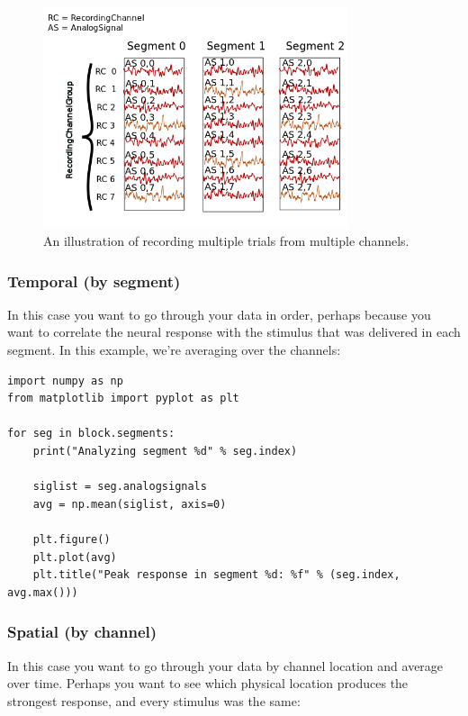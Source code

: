 \documentclass{frontiers}
\begin{document}
\begin{figure}
\centering
\includegraphics[width=0.8\textwidth]{figures/usecase1}
\caption{An illustration of recording multiple trials from multiple channels.}\label{fig:usecase1} 
\end{figure}

\subsubsection{Temporal (by segment)}

In this case you want to go through your data in order, perhaps because you want to correlate the neural response with the stimulus that was delivered in each segment. In this example, we’re averaging over the channels:

\begin{lstlisting}[style=display]
import numpy as np
from matplotlib import pyplot as plt

for seg in block.segments:
    print("Analyzing segment %d" % seg.index)

    siglist = seg.analogsignals
    avg = np.mean(siglist, axis=0)

    plt.figure()
    plt.plot(avg)
    plt.title("Peak response in segment %d: %f" % (seg.index, avg.max()))
\end{lstlisting}

\subsubsection{Spatial (by channel)}

In this case you want to go through your data by channel location and average over time. Perhaps you want to see which physical location produces the strongest response, and every stimulus was the same:
\end{document}
